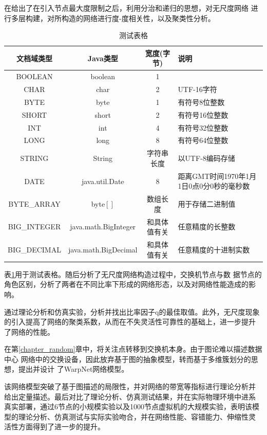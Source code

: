 \documentclass[bachelor,winfonts]{jnuthesis}
\begin{document}
    在给出了在引入节点最大度限制之后，利用分治和递归的思想，对无尺度网络
    进行多层构建，对所构造的网络进行度-度相关性，以及聚类性分析。
    
    \begin{table}
        \centering
        \begin{tabular}{cccp{38mm}}
            \toprule
            \textbf{文档域类型} & \textbf{Java类型} & \textbf{宽度(字节)} & \textbf{说明} \\
            \midrule
            BOOLEAN  & boolean &  1  & \\
            CHAR     & char    &  2  & UTF-16字符 \\
            BYTE     & byte    &  1  & 有符号8位整数 \\
            SHORT    & short   &  2  & 有符号16位整数 \\
            INT      & int     &  4  & 有符号32位整数 \\
            LONG     & long    &  8  & 有符号64位整数 \\
            STRING   & String  &  字符串长度  & 以UTF-8编码存储 \\
            DATE     & java.util.Date & 8 & 距离GMT时间1970年1月1日0点0分0秒的毫秒数 \\
            BYTE\_ARRAY & byte$[]$ & 数组长度 & 用于存储二进制值 \\
            BIG\_INTEGER & java.math.BigInteger & 和具体值有关 & 任意精度的长整数 \\
            BIG\_DECIMAL & java.math.BigDecimal & 和具体值有关 & 任意精度的十进制实数 \\
            \bottomrule
        \end{tabular}
        \caption{测试表格}\label{table:test5}
    \end{table}
    
    表\ref{table:test5}用于测试表格。随后分析了无尺度网络构造过程中，交换机节点与数
    据节点的角色区别，分析了两者在不同比率下形成的网络形态，以及对网络性能造成的影响。
    
    通过理论分析和仿真实验，分析并找出比率因子q的最佳取值。此外，无尺度现象
    的引入提高了网络的聚类系数，从而在不失灵活性可靠性的基础上，进一步提升
    了网络的性能。
    
    在第\ref{chapter_random}章中，将关注点转移到交换机本身。由于图论难以描述数据中心
    网络中的交换设备，因此放弃基于图的抽象模型，转而基于多维簇划分的思想，提出并设计
    了WarpNet网络模型。
    
    该网络模型突破了基于图描述的局限性，并对网络的带宽等指标进行理论分析并
    给出定量描述。最后对比了理论分析、仿真测试结果，并在实际物理环境中进系
    真实部署，通过6节点的小规模实验以及1000节点虚拟机的大规模实验，表明该模
    型的理论分析、仿真测试与实际实验吻合，并在网络性能、容错能力、伸缩性灵
    活性方面得到了进一步的提升。
    
\end{document}
